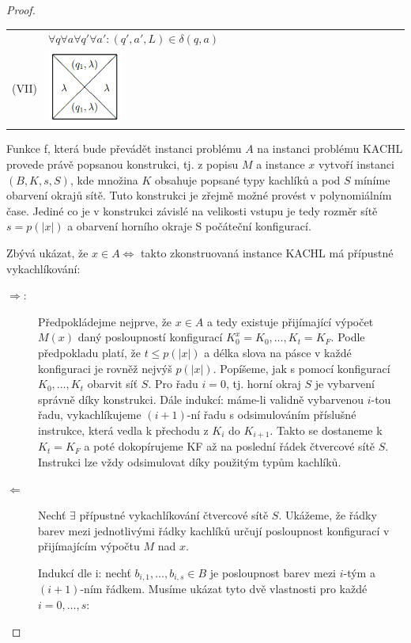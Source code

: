 \documentclass[11pt]{report} %
\numberwithin{equation}{section}
\begin{document}
\begin{proof}
\begin{table}[H]
\begin{tabular}{| m{0.05\linewidth}  m{0.45\linewidth} | m{0.5\linewidth}| }
		& $\forall q \forall a \forall q' \forall a' : (q',a',L) \in \delta(q,a)$\\
		(VII) & \includegraphics[width=70pt]{img/kachl7.png} 
		& \\ \hline

	\end{tabular}

\end{table}

Funkce f, která bude převádět instanci problému $A$ na instanci problému KACHL provede právě popsanou konstrukci, tj. z popisu $M$ a instance $x$ vytvoří instanci $(B, K, s, S)$, kde množina $K$ obsahuje popsané typy kachlíků a pod $S$ míníme obarvení okrajů sítě. Tuto konstrukci je zřejmě možné provést v polynomiálním čase. Jediné co je v konstrukci závislé na velikosti vstupu je tedy rozměr sítě $s = p(|x|)$ a obarvení horního okraje S počáteční konfigurací.

Zbývá ukázat, že $x \in A \Leftrightarrow $ takto zkonstruovaná instance KACHL má přípustné vykachlíkování:
\begin{description}
	
	\item[$\Rightarrow$:] 
	Předpokládejme nejprve, že $x \in A$ a tedy existuje přijímající výpočet $M(x)$ daný posloupností konfigurací $K_0^x = K_0, \dots, K_t = K_F$. Podle předpokladu platí, že $t \leq p(|x|)$ a délka slova na pásce v každé konfiguraci je rovněž nejvýš $p(|x|)$. Popíšeme, jak s pomocí konfigurací $K_0, \dots, K_t$ obarvit síť $S$. Pro řadu $i = 0$, tj. horní okraj $S$ je vybarvení správně díky konstrukci. Dále indukcí: máme-li validně vybarvenou $i$-tou řadu, vykachlíkujeme $(i + 1)$-ní řadu s odsimulováním příslušné instrukce, která vedla k přechodu z $K_i$ do $K_{i+1}$. Takto se dostaneme k $K_t = K_F$ a poté dokopírujeme KF až na poslední řádek čtvercové sítě $S$. 
	Instrukci lze vždy odsimulovat díky použitým typům kachlíků. 

	\item[$\Leftarrow$] Nechť $\exists$ přípustné vykachlíkování čtvercové sítě $S$. Ukážeme, že řádky barev mezi jednotlivými řádky kachlíků určují posloupnost konfigurací v přijímajícím výpočtu $M$ nad $x$. 
	
	Indukcí dle i: nechť $b_{i,1}, \dots, b_{i,s} \in B$ je posloupnost barev mezi $i$-tým a $(i+1)$-ním řádkem. Musíme ukázat tyto dvě vlastnosti pro každé $i = 0, \dots, s$:
	\begin{enumerate}
		

\end{enumerate}
\end{description}
\end{proof}
\end{document}
